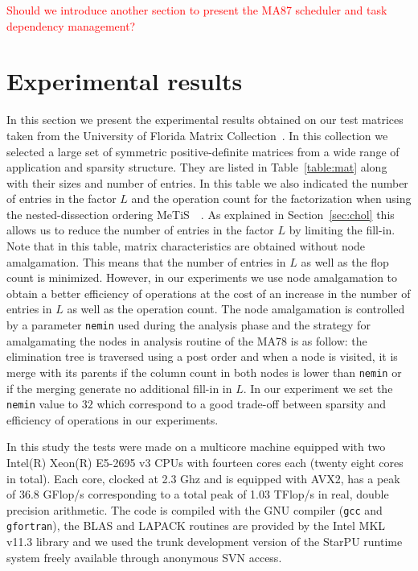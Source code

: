 \documentclass{article}
\newcommand{\alert}[1]{\textcolor{red}{#1}\xspace}
\newcommand{\starpu}{{StarPU}\xspace}
\newcommand{\lsection}[1]{\section{#1} \setcounter{equation}{0} \setcounter{figure}{0} \setcounter{table}{0} \label{#1}}
\newcommand{\metis}{{\sc Me$\!$T$\!$iS\ }}
\begin{document}

\alert{Should we introduce another section to present the MA87
  scheduler and task dependency management?}

\lsection{Experimental results}\label{sec:experiments}

In this section we present the experimental results obtained on our
test matrices taken from the University of Florida Matrix
Collection~\cite{d.h:11}. In this collection we selected a large set
of symmetric positive-definite matrices from a wide range of
application and sparsity structure. They are listed in
Table~\ref{table:mat} along with their sizes and number of entries. In
this table we also indicated the number of entries in the factor $L$
and the operation count for the factorization when using the
nested-dissection ordering \metis~\cite{k.k:98}. As explained in
Section~\ref{sec:chol} this allows us to reduce the number of entries
in the factor $L$ by limiting the fill-in. Note that in this table,
matrix characteristics are obtained without node amalgamation. This
means that the number of entries in $L$ as well as the flop count is
minimized. However, in our experiments we use node amalgamation to
obtain a better efficiency of operations at the cost of an increase in
the number of entries in $L$ as well as the operation count. The node
amalgamation is controlled by a parameter \texttt{nemin} used during
the analysis phase and the strategy for amalgamating the nodes in
analysis routine of the MA78 is as follow: the elimination tree is
traversed using a post order and when a node is visited, it is merge
with its parents if the column count in both nodes is lower than
\texttt{nemin} or if the merging generate no additional fill-in in
$L$. In our experiment we set the \texttt{nemin} value to $32$ which
correspond to a good trade-off between sparsity and efficiency of
operations in our experiments.

In this study the tests were made on a multicore machine equipped with
two Intel(R) Xeon(R) E5-2695 v3 CPUs with fourteen cores each (twenty
eight cores in total). Each core, clocked at 2.3 Ghz and is equipped
with AVX2, has a peak of 36.8 GFlop/s corresponding to a total peak of
1.03 TFlop/s in real, double precision arithmetic. The code is
compiled with the GNU compiler (\texttt{gcc} and \texttt{gfortran}),
the BLAS and LAPACK routines are provided by the Intel MKL v11.3
library and we used the trunk development version of the \starpu
runtime system freely available through anonymous SVN access.
\end{document}
